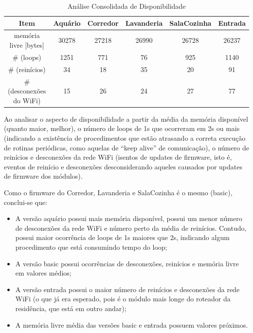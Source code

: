 \begin{table}[H]
    \caption{Análise Consolidada de Disponibilidade}
    \setlength\tabcolsep{1.5pt}
    \centering
    \footnotesize
    \begin{tabular}{cccccc}
        \textbf{Item} & \textbf{Aquário} & \textbf{Corredor} & \textbf{Lavanderia} & \textbf{SalaCozinha} & \textbf{Entrada} \\
        \midrule
        memória livre [bytes] &
        30278 &
        27218 &
        26990 &
        26728 &
        26237 \\
        \# (loops) &
        1251 &
        771 &
        76 &
        925 &
        1140 \\
        \# (reinícios) &
        34 &
        18 &
        35 &
        20 &
        91 \\
        \# (desconexões do WiFi) &
        15 &
        26 &
        24 &
        27 &
        77 \\
    \end{tabular}
\end{table}

Ao analisar o aspecto de disponibilidade a partir da média da memória disponível (quanto maior, melhor), o número de loops de 1s que ocorreram em 2s ou mais (indicando a existência de procedimentos que estão atrasando a correta execução de rotinas periódicas, como aquelas de “keep alive” de comunicação), o número de reinícios e desconexões da rede WiFi (isentos de updates de firmware, isto é, eventos de reinício e desconexões desconsiderando aqueles causados por updates de firmware dos módulos).

Como o firmware do Corredor, Lavanderia e SalaCozinha é o mesmo (basic), conclui-se que:

\begin{itemize}
	\item A versão aquário possui mais memória disponível, possui um menor número de desconexões da rede WiFi e número perto da média de reinícios. Contudo, possui maior ocorrência de loops de 1s maiores que 2s, indicando algum procedimento que está consumindo tempo do loop;
	\item A versão basic possui ocorrências de desconexões, reinícios e memória livre em valores médios;
	\item A versão entrada possui o maior número de reinícios e desconexões da rede WiFi (o que já era esperado, pois é o módulo mais longe do roteador da residência, que está em outro andar);
	\item A memória livre média das versões basic e entrada possuem valores próximos.
\end{itemize}

